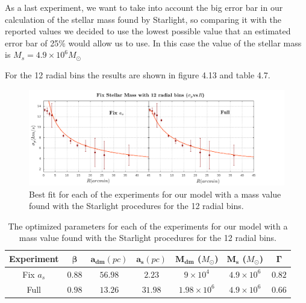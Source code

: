 As a last experiment, we want to take into account the big error bar in our calculation of the stellar mass found by Starlight, so comparing it with the reported values we decided to use the lowest possible value that an estimated error bar of 25\% would allow us to use. In this case the value of the stellar mass is $M_{s}=4.9 \times 10^{6} M_{\odot}$

For the 12 radial bins the results are shown in figure 4.13 and table 4.7.

\begin{figure}[H]
\centering
\includegraphics[width=15cm]{images/Starlight_25_12.png}
\caption[Best fits for our model with a mass value based on the Starlight procedures for the 12 radial bins.]{Best fit for each of the experiments for our model with a mass value found with the Starlight procedures for the 12 radial bins.}
\end{figure}

\begin{table}[H]
\begin{center}
\begin{tabular}{| c| c| c| c| c| c| c|}
    \hline
    \textbf{Experiment} & $\mathbf{\beta}$ & $\mathbf{a_{dm}} (pc)$ & $\mathbf{a_{s}} (pc)$ & $\mathbf{M_{dm}}$ ($M_{\odot}$) & $\mathbf{M_{s}}$ ($M_{\odot}$) & $\mathbf{\Gamma}$\\ \hline
	Fix $a_s$ &	$0.88$ &	$56.98$ &	$2.23$ &	$9 \times 10^{4}$ &	$4.9 \times 10 ^{6}$ &	$0.82$\\ \hline
	Full &	$0.98$ &	$13.26$ &	$31.98$ &	$1.98 \times 10^{6}$ &	$4.9 \times 10^{6}$ &	$0.66$\\ \hline
  \end{tabular} 
\caption[Optimized parameters for our model with a mass value based on the Starlight procedures for the 12 radial bins.]{The optimized parameters for each of the experiments for our model with a mass value found with the Starlight procedures for the 12 radial bins.}
\end{center}
\end{table}

